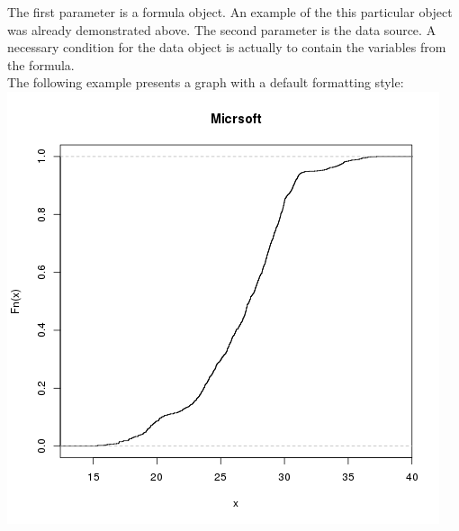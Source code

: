\documentclass[
  twoside,
  11pt, a4paper,
  footinclude=true,
  headinclude=true,
  cleardoublepage=empty
]{scrreprt}
\begin{document}
    The first parameter is a formula object. An example of the this particular object was already demonstrated above. The second parameter is the data source. A necessary condition for the data object is actually to contain the variables from the formula.\\
    The following example presents a graph with a default formatting style:
    \includegraphics[scale=0.75]{RPlotExample.png}
     
\end{document}
